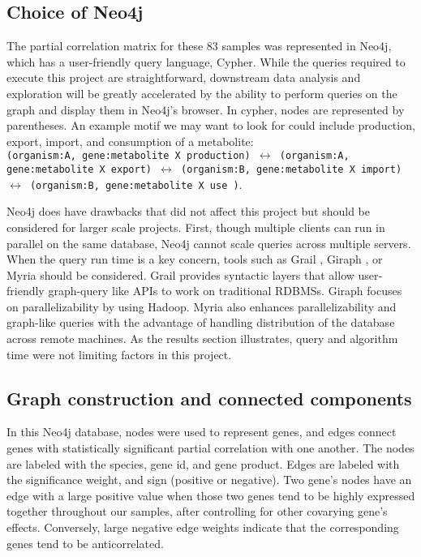 \documentclass[12pt]{article}
\begin{document}
\subsection{Choice of Neo4j}

The partial correlation matrix for these 83 samples was represented in Neo4j, which has a user-friendly query language, Cypher. %
While the queries required to execute this project are straightforward, downstream data analysis and exploration will be greatly accelerated by the ability to perform queries on the graph and display them in Neo4j's browser. 
In cypher, nodes are represented by parentheses.  
An example motif we may want to look for could include production, export, import, and consumption of a metabolite: \hfill \\
\texttt{(organism:A, gene:metabolite X production) $\leftrightarrow$ (organism:A, gene:metabolite X export) $\leftrightarrow$ (organism:B, gene:metabolite X import) $\leftrightarrow$ (organism:B, gene:metabolite X use )}.  

Neo4j does have drawbacks that did not affect this project but should be considered for larger scale projects.
First, though multiple clients can run in parallel on the same database, Neo4j cannot scale queries across multiple servers.  
When the query run time is a key concern, tools such as Grail \cite{fan2015case}, Giraph \cite{fan2015case}, or Myria \cite{halperin2014demonstration} should be considered. 
Grail provides syntactic layers that allow user-friendly graph-query like APIs to work on traditional RDBMSs.
Giraph focuses on parallelizability by using Hadoop. 
Myria also enhances parallelizability and graph-like queries with the advantage of handling distribution of the database across remote machines. 
As the results section illustrates, query and algorithm time were not limiting factors in this project. 

\subsection{Graph construction and connected components}

In this Neo4j database, nodes were used to represent genes, and edges connect genes with statistically significant partial correlation with one another. 
The nodes are labeled with the species, gene id, and gene product.
Edges are labeled with the significance weight, and sign (positive or negative). 
Two gene's nodes have an edge with a large positive value when those two genes tend to be highly expressed together throughout our samples, after controlling for other covarying gene's effects. 
Conversely, large negative edge weights indicate that the corresponding genes tend to be anticorrelated. 
\end{document}
